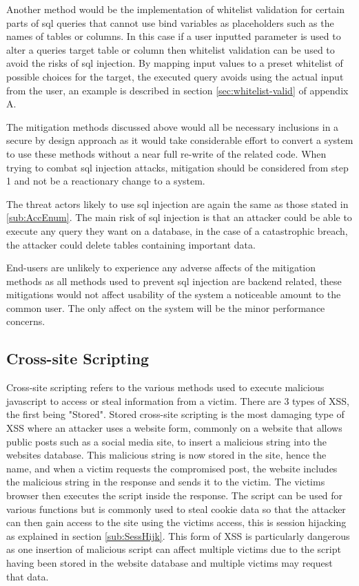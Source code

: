 \documentclass{ueacmpstyle}
\begin{document}
      Another method would be the implementation of whitelist validation for certain 
      parts of sql queries that cannot use bind variables as placeholders such as the 
      names of tables or columns. In this case if a user inputted parameter is used to 
      alter a queries target table or column then whitelist validation can be used to 
      avoid the risks of sql injection. By mapping input values to a preset whitelist 
      of possible choices for the target, the executed query avoids using the actual 
      input from the user, an example is described in section \ref{sec:whitelist-valid} 
      of appendix A.

      The mitigation methods discussed above would all be necessary inclusions in a 
      secure by design approach as it would take considerable effort to convert a system 
      to use these methods without a near full re-write of the related code. When trying 
      to combat sql injection attacks, mitigation should be considered from step 1 and not 
      be a reactionary change to a system.

      The threat actors likely to use sql injection are again the same as those stated 
      in \ref{sub:AccEnum}. The main risk of sql injection is that an attacker could be 
      able to execute any query they want on a database, in the case of a catastrophic 
      breach, the attacker could delete tables containing important data.

      End-users are unlikely to experience any adverse affects of the mitigation methods 
      as all methods used to prevent sql injection are backend related, these mitigations 
      would not affect usability of the system a noticeable amount to the common user. 
      The only affect on the system will be the minor performance concerns.

      \subsection{Cross-site Scripting}\label{sub:XSS}
      Cross-site scripting refers to the various methods used to execute malicious 
      javascript to access or steal information from a victim. There are 3 types of XSS, 
      the first being "Stored". Stored cross-site scripting is the most damaging type of 
      XSS where an attacker uses a website form, commonly on a website that allows public 
      posts such as a social media site, to insert a malicious string into the websites 
      database. This malicious string is now stored in the site, hence the name, and when 
      a victim requests the compromised post, the website includes the malicious string in 
      the response and sends it to the victim. The victims browser then executes the script 
      inside the response. The script can be used for various functions but is commonly used 
      to steal cookie data so that the attacker can then gain access to the site using the 
      victims access, this is session hijacking as explained in section \ref{sub:SessHijk}. 
      This form of XSS is particularly dangerous as one insertion of malicious script can 
      affect multiple victims due to the script having been stored in the website database 
      and multiple victims may request that data.
\end{document}
